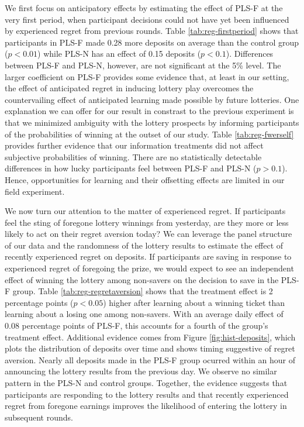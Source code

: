 \documentclass[12pt, titlepage]{article}
\begin{document}
		We first focus on anticipatory effects by estimating the effect of PLS-F at the very first period, when participant decisions could not have yet been influenced by experienced regret from previous rounds. Table \ref{tab:reg-firstperiod} shows that participants in PLS-F made 0.28 more deposits on average than the control group ($p < 0.01$) while PLS-N has an effect of 0.15 deposits ($p < 0.1$). Differences between PLS-F and PLS-N, however, are not significant at the 5\% level. The larger coefficient on PLS-F provides some evidence that, at least in our setting, the effect of anticipated regret in inducing lottery play overcomes the countervailing effect of anticipated learning made possible by future lotteries. One explanation we can offer for our result in constrast to the previous experiment is that we minimized ambiguity with the lottery prospects by informing participants of the probabilities of winning at the outset of our study. Table \ref{tab:reg-fwerself} provides further evidence that our information treatments did not affect subjective probabilities of winning. There are no statistically detectable differences in how lucky participants feel between PLS-F and PLS-N ($p > 0.1$). Hence, opportunities for learning and their offsetting effects are limited in our field experiment.

		

		We now turn our attention to the matter of experienced regret. If participants feel the sting of foregone lottery winnings from yesterday, are they more or less likely to act on their regret aversion today? We can leverage the panel structure of our data and the randomness of the lottery results to estimate the effect of recently experienced regret on deposits. If participants are saving in response to experienced regret of foregoing the prize, we would expect to see an independent effect of winning the lottery among non-savers on the decision to save in the PLS-F group. Table \ref{tab:reg-regretaversion} shows that the treatment effect is 2 percentage points ($p<0.05$) higher after learning about a winning ticket than learning about a losing one among non-savers. With an average daily effect of 0.08 percentage points of PLS-F, this accounts for a fourth of the group's treatment effect. Additional evidence comes from Figure \ref{fig:hist-deposits}, which plots the distribution of deposits over time and shows timing suggestive of regret aversion. Nearly all deposits made in the PLS-F group ocurred within an hour of announcing the lottery results from the previous day. We observe no similar pattern in the PLS-N and control groups. Together, the evidence suggests that participants are responding to the lottery results and that recently experienced regret from foregone earnings improves the likelihood of entering the lottery in subsequent rounds.
\end{document}

